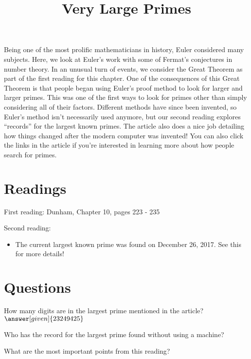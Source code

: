 \documentclass[nooutcomes]{ximera}
\title{Very Large Primes}
\begin{document}
\begin{abstract}
    
\end{abstract}
\maketitle

Being one of the most prolific mathematicians in history, Euler considered many subjects.  Here, we look at Euler's work with some of Fermat's conjectures in number theory.  In an unusual turn of events, we consider the Great Theorem as part of the first reading for this chapter.  One of the consequences of this Great Theorem is that people began using Euler's proof method to look for larger and larger primes.  This was one of the first ways to look for primes other than simply considering all of their factors.  Different methods have since been invented, so Euler's method isn't necessarily used anymore, but our second reading explores ``records'' for the largest known primes.  The article also does a nice job detailing how things changed after the modern computer was invented!  You can also click the links in the article if you're interested in learning more about how people search for primes.


\section{Readings}
First reading: Dunham, Chapter 10, pages 223 - 235

Second reading: 

\begin{itemize}
	\item The current largest known prime was found on December 26, 2017.  See this  for more details!
\end{itemize}



\section{Questions}

\begin{question}
How many digits are in the largest prime mentioned in the article? $\answer[given]{23249425}$
\end{question}

\begin{question}
Who has the record for the largest prime found without using a machine?
\begin{multipleChoice}
\end{multipleChoice}
\end{question}


\begin{question}
What are the most important points from this reading?
\begin{freeResponse}
\end{freeResponse}

\end{question}
\end{document}
